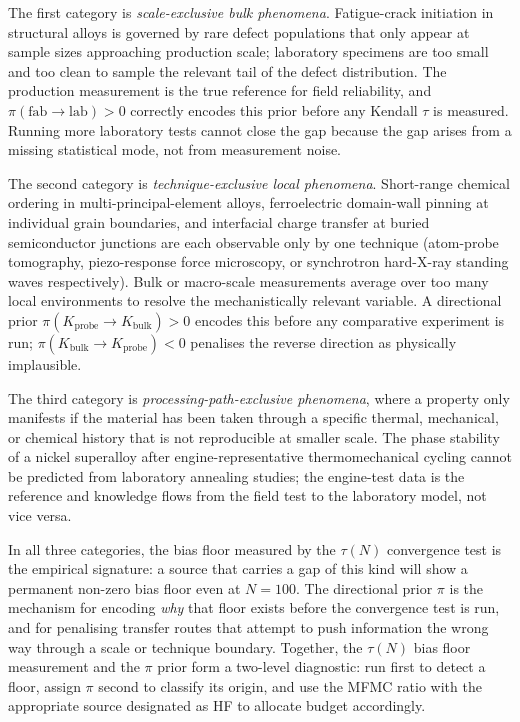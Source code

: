 \documentclass[twoside,twocolumn,9pt]{article}
\begin{document}
The first category is \emph{scale-exclusive bulk phenomena}. Fatigue-crack initiation in structural alloys is governed by rare defect populations that only appear at sample sizes approaching production scale; laboratory specimens are too small and too clean to sample the relevant tail of the defect distribution.\cite{Suresh1998FatigueMaterials} The production measurement is the true reference for field reliability, and $\pi(\mathrm{fab} \to \mathrm{lab}) > 0$ correctly encodes this prior before any Kendall $\tau$ is measured. Running more laboratory tests cannot close the gap because the gap arises from a missing statistical mode, not from measurement noise.

The second category is \emph{technique-exclusive local phenomena}. Short-range chemical ordering in multi-principal-element alloys, ferroelectric domain-wall pinning at individual grain boundaries, and interfacial charge transfer at buried semiconductor junctions are each observable only by one technique (atom-probe tomography, piezo-response force microscopy, or synchrotron hard-X-ray standing waves respectively). Bulk or macro-scale measurements average over too many local environments to resolve the mechanistically relevant variable. A directional prior $\pi(K_{\mathrm{probe}} \to K_{\mathrm{bulk}}) > 0$ encodes this before any comparative experiment is run; $\pi(K_{\mathrm{bulk}} \to K_{\mathrm{probe}}) < 0$ penalises the reverse direction as physically implausible.

The third category is \emph{processing-path-exclusive phenomena}, where a property only manifests if the material has been taken through a specific thermal, mechanical, or chemical history that is not reproducible at smaller scale.\cite{McDowell2010MultiscalePlasticity,Panchal2013ICME} The phase stability of a nickel superalloy after engine-representative thermomechanical cycling cannot be predicted from laboratory annealing studies; the engine-test data is the reference and knowledge flows from the field test to the laboratory model, not vice versa.

In all three categories, the bias floor measured by the $\tau(N)$ convergence test is the empirical signature: a source that carries a gap of this kind will show a permanent non-zero bias floor even at $N = 100$. The directional prior $\pi$ is the mechanism for encoding \emph{why} that floor exists before the convergence test is run, and for penalising transfer routes that attempt to push information the wrong way through a scale or technique boundary. Together, the $\tau(N)$ bias floor measurement and the $\pi$ prior form a two-level diagnostic: run first to detect a floor, assign $\pi$ second to classify its origin, and use the MFMC ratio with the appropriate source designated as HF to allocate budget accordingly.
\end{document}
